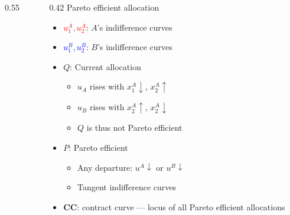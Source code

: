 \documentclass[aspectratio=169]{beamer}
\begin{document}
\begin{frame}
\begin{columns}
\begin{column}{0.55\textwidth}
\end{column}
\begin{column}{0.42\textwidth}
Pareto efficient allocation
\begin{itemize}\setlength\itemsep{5pt}
  \item \textcolor{red}{$u_1^A, u_2^A$}:
  $A$'s indifference curves
  \item \textcolor{blue}{$u_1^B,u_2^B$}:
  $B$'s indifference curves
  \item $Q$: Current allocation
  \begin{itemize}\setlength\itemsep{5pt}
    \item $u_A$ rises with $x_1^A\downarrow$, $x_2^A\uparrow$ 
    \item $u_B$ rises with $x_2^A\uparrow$, $x_2^A\downarrow$ 
    \item $Q$ is thus not Pareto efficient
  \end{itemize}
  \item $P$: Pareto efficient
  \begin{itemize}\setlength\itemsep{5pt}
    \item Any departure: $u^A\downarrow$ or $u^B\downarrow$
    \item Tangent indifference curves
  \end{itemize}
  \item \textbf{CC}: contract curve ---
  locus of all Pareto efficient
  allocations
\end{itemize}
\end{column}
\end{columns}
\end{frame}
\end{document}
